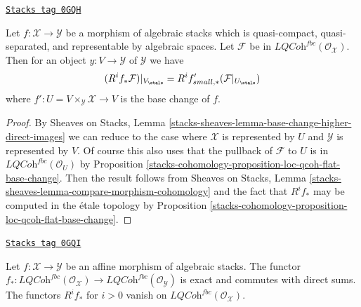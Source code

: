 \begin{lemma}
\label{stacks-cohomology-lemma-loc-qcoh-fbc-compute-higher-direct-image}
\href{https://stacks.math.columbia.edu/tag/0GQH}{\texttt{Stacks tag 0GQH}}

Let $f : \mathcal{X} \to \mathcal{Y}$ be a morphism of algebraic stacks
which is quasi-compact, quasi-separated, and
representable by algebraic spaces. Let $\mathcal{F}$ be in
$\textit{LQCoh}^{fbc}(\mathcal{O}_\mathcal{X})$.
Then for an object $y : V \to \mathcal{Y}$ of $\mathcal{Y}$ we have
$$
(R^if_*\mathcal{F})|_{V_\etale} = R^if'_{small, *}(\mathcal{F}|_{U_\etale})
$$
where $f' : U = V \times_\mathcal{Y} \mathcal{X} \to V$ is the base
change of $f$.
\end{lemma}

\begin{proof}
By Sheaves on Stacks, Lemma
\ref{stacks-sheaves-lemma-base-change-higher-direct-images}
we can reduce to the case where $\mathcal{X}$
is represented by $U$ and $\mathcal{Y}$ is
represented by $V$. Of course this also uses that the pullback of
$\mathcal{F}$ to $U$ is in $\textit{LQCoh}^{fbc}(\mathcal{O}_U)$
by Proposition \ref{stacks-cohomology-proposition-loc-qcoh-flat-base-change}.
Then the result follows from
Sheaves on Stacks, Lemma
\ref{stacks-sheaves-lemma-compare-morphism-cohomology}
and the fact that $R^if_*$ may be computed in the
\'etale topology by
Proposition \ref{stacks-cohomology-proposition-loc-qcoh-flat-base-change}.
\end{proof}

\begin{lemma}
\label{stacks-cohomology-lemma-loc-qcoh-fbc-affine-direct-image}
\href{https://stacks.math.columbia.edu/tag/0GQI}{\texttt{Stacks tag 0GQI}}

Let $f : \mathcal{X} \to \mathcal{Y}$ be an affine morphism of algebraic
stacks. The functor $f_* : \textit{LQCoh}^{fbc}(\mathcal{O}_\mathcal{X}) \to
\textit{LQCoh}^{fbc}(\mathcal{O}_\mathcal{Y})$ is exact and commutes
with direct sums. The functors $R^if_*$ for $i > 0$ vanish on
$\textit{LQCoh}^{fbc}(\mathcal{O}_\mathcal{X})$.
\end{lemma}

